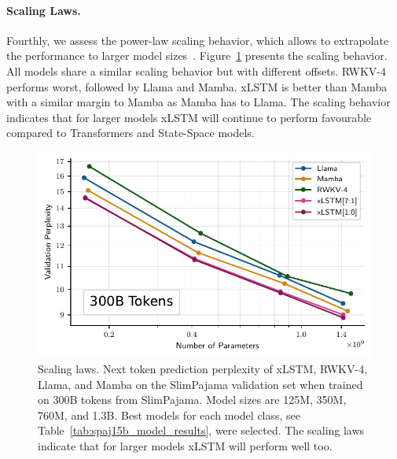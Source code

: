 \documentclass[dvipsnames]{article}
\begin{document}
\paragraph{Scaling Laws.}
Fourthly, we assess  
the power-law scaling behavior, which allows to extrapolate the performance to
larger model sizes~\citep{Kaplan:20,Brown:20short}.
Figure~\ref{fig:temp_sclaw300B} presents the scaling behavior.
All models share a similar scaling behavior but with different offsets. 
RWKV-4 performs worst, followed by Llama and Mamba. 
xLSTM is better than Mamba with a similar margin to Mamba as Mamba has to Llama. 
The scaling behavior indicates that for larger models xLSTM will continue to perform favourable compared to Transformers and State-Space models.

\begin{figure}[htp]
    \centering
    \includegraphics[width=1.0\textwidth]{figures/plot_spaj300b_xlstm_scaling_laws.pdf}
    \caption{Scaling laws. Next token prediction perplexity of 
    xLSTM, RWKV-4, Llama, and Mamba
    on the SlimPajama validation set
    when trained
    on 300B tokens from SlimPajama. 
    Model sizes are 125M, 350M, 760M, 
    and 1.3B. Best models for each model class, see Table~\ref{tab:spaj15b_model_results}, were selected. The scaling laws indicate that 
    for larger models xLSTM will perform well too.
   \label{fig:temp_sclaw300B}}
\end{figure}
\end{document}
